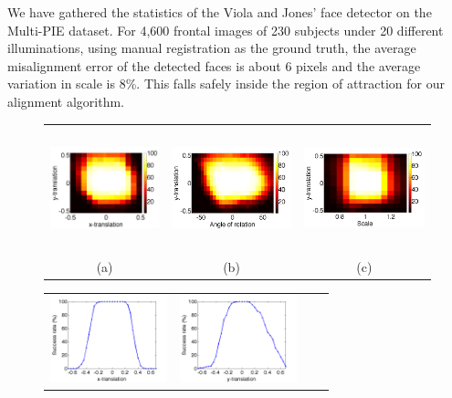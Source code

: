 \documentclass[10pt,journal,letterpaper,compsoc]{IEEEtran} %
\begin{document}
We have gathered the statistics of the Viola and Jones'
 face detector on the Multi-PIE dataset. For 4,600 frontal
 images of 230 subjects under 20 different illuminations,
 using manual registration as the ground truth, the average
 misalignment error of the detected faces is about 6 pixels
 and the average variation in scale is 8\%. This falls
 safely inside the region of attraction for our alignment
 algorithm.
\begin{figure}
\centering
{\small
\begin{tabular}{ccc}
\includegraphics[height=1.4in]{figures_pami/x_y_roa.png} &
\includegraphics[height=1.4in]{figures_pami/y_theta_roa.png} &
\includegraphics[height=1.4in]{figures_pami/y_s_roa.png}\\
(a)&(b)&(c)
\end{tabular}
\begin{tabular}{cccc}
\includegraphics[height=1in]{figures_pami/x_tr.png} &
\includegraphics[height=1in]{figures_pami/y_tr.png} &

\end{tabular}}
\end{figure}
\end{document}

